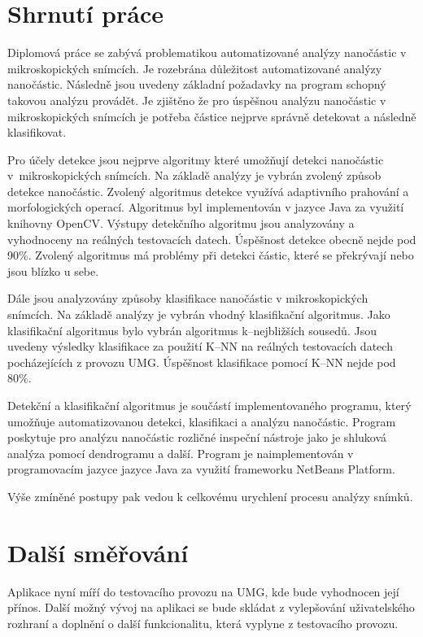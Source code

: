 \documentclass[11pt,twoside,a4paper,table]{book}
\begin{document}
\section{Shrnutí práce}
Diplomová práce se zabývá problematikou automatizované analýzy nanočástic v mikroskopických snímcích. Je rozebrána důležitost automatizované analýzy nanočástic. Následně jsou uvedeny základní požadavky na program schopný takovou analýzu provádět. Je zjištěno že pro úspěšnou analýzu nanočástic v mikroskopických snímcích je potřeba částice nejprve správně detekovat a následně klasifikovat.

Pro účely detekce jsou nejprve algoritmy které umožňují detekci nanočástic v~mikroskopických snímcích. Na základě analýzy je vybrán zvolený způsob detekce nanočástic. Zvolený algoritmus detekce využívá adaptivního prahování a morfologických operací. Algoritmus byl implementován v jazyce Java za využití knihovny OpenCV. Výstupy detekčního algoritmu jsou analyzovány a vyhodnoceny na reálných testovacích datech. Úspěšnost detekce obecně nejde pod 90\%. Zvolený algoritmus má problémy při detekci částic, které se překrývají nebo jsou blízko u sebe.

Dále jsou analyzovány způsoby klasifikace nanočástic v mikroskopických snímcích. Na základě analýzy je vybrán vhodný klasifikační algoritmus. Jako klasifikační algoritmus bylo vybrán algoritmus k--nejbližších sousedů. Jsou uvedeny výsledky klasifikace za použití K--NN na reálných testovacích datech pocházejících z provozu UMG. Úspěšnost klasifikace pomocí K--NN nejde pod 80\%.

Detekční a klasifikační algoritmus je součástí implementovaného programu, který umožňuje automatizovanou detekci, klasifikaci a analýzu nanočástic. Program poskytuje pro analýzu nanočástic rozličné inspeční nástroje jako je shluková analýza pomocí dendrogramu a další. Program je naimplementován v programovacím jazyce jazyce Java za využití frameworku NetBeans Platform.

Výše zmíněné postupy pak vedou k celkovému urychlení procesu analýzy snímků.

\section{Další směřování}
Aplikace nyní míří do testovacího provozu na UMG, kde bude vyhodnocen její přínos. Další možný vývoj na aplikaci se bude skládat z vylepšování uživatelského rozhraní a doplnění o další funkcionalitu, která vyplyne z testovacího provozu.
\end{document}

